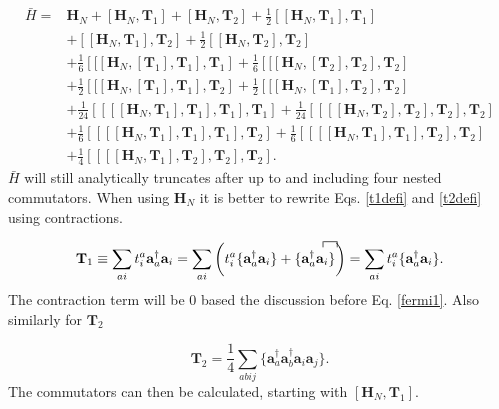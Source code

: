 \documentclass[a4paper,norsk,11pt,twoside]{report}
\begin{document}
\begin{align}
\bar{H} = & 
\textbf{H}_N 
+ \left[ \textbf{H}_N, \textbf{T}_1 \right] 
+ \left[ \textbf{H}_N, \textbf{T}_2 \right] 
+ \frac{1}{2} \left[ [\textbf{H}_N, \textbf{T}_1], \textbf{T}_1 \right] \label{temp_hamil_ccsd} \\ &
+ \left[ [\textbf{H}_N, \textbf{T}_1], \textbf{T}_2  \right]
+ \frac{1}{2} \left[ [\textbf{H}_N, \textbf{T}_2], \textbf{T}_2 \right] \nonumber \\ &
+ \frac{1}{6} \left[ [ [ \textbf{H}_N,[\textbf{T}_1], \textbf{T}_1], \textbf{T}_1 \right]
+ \frac{1}{6} \left[ [ [ \textbf{H}_N,[\textbf{T}_2], \textbf{T}_2], \textbf{T}_2 \right] \nonumber \\ &
+ \frac{1}{2} \left[ [ [ \textbf{H}_N,[\textbf{T}_1], \textbf{T}_1], \textbf{T}_2 \right]
+ \frac{1}{2} \left[ [ [ \textbf{H}_N,[\textbf{T}_1], \textbf{T}_2], \textbf{T}_2 \right] \nonumber \\ &
+ \frac{1}{24} \left[ [ [ [\textbf{H}_N, \textbf{T}_1], \textbf{T}_1], \textbf{T}_1], \textbf{T}_1  \right]
+ \frac{1}{24} \left[ [ [ [\textbf{H}_N, \textbf{T}_2], \textbf{T}_2], \textbf{T}_2], \textbf{T}_2  \right] \nonumber \\ &
+ \frac{1}{6} \left[ [ [ [\textbf{H}_N, \textbf{T}_1], \textbf{T}_1], \textbf{T}_1], \textbf{T}_2  \right]
+ \frac{1}{6} \left[ [ [ [\textbf{H}_N, \textbf{T}_1], \textbf{T}_1], \textbf{T}_2], \textbf{T}_2  \right] \nonumber \\ &
+ \frac{1}{4} \left[ [ [ [\textbf{H}_N, \textbf{T}_1], \textbf{T}_2], \textbf{T}_2], \textbf{T}_2  \right] . \nonumber
\end{align}
$\bar{H}$ will still analytically truncates after up to and including four nested commutators. When using $\textbf{H}_N$ it is better to rewrite Eqs. \eqref{t1defi} and \eqref{t2defi} using contractions.

\begin{equation}
\textbf{T}_1 \equiv \sum_{ai} t_i^a \textbf{a}^{\dag}_a \textbf{a}_i = \sum_{ai} \left( t_i^a \{\textbf{a}^{\dag}_a \textbf{a}_i\} + \{
\contraction{}{\textbf{a}^{\dag}_a}{}{\textbf{a}_i}
\textbf{a}^{\dag}_a \textbf{a}_i
\} \right) = \sum_{ai} t_i^a \{\textbf{a}^{\dag}_a \textbf{a}_i\} .
\end{equation}
The contraction term will be 0 based the discussion before Eq. \eqref{fermi1}. Also similarly for $\textbf{T}_2$

\begin{equation}
\textbf{T}_2 = \frac{1}{4} \sum_{abij} \{
\textbf{a}^{\dag}_a \textbf{a}^{\dag}_b
\textbf{a}_i \textbf{a}_j \} .
\end{equation}
The commutators can then be calculated, starting with $[\textbf{H}_N, \textbf{T}_1]$.
\end{document}
